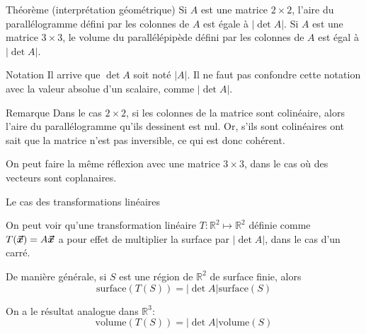 \documentclass[a4paper]{article}
\begin{document}
\begin{parag}{Théorème (interprétation géométrique)}
    Si $A$ est une matrice $2 \times 2$, l'aire du parallélogramme défini par les colonnes de $A$ est égale à $\left|\det A\right|$. Si $A$ est une matrice $3\times 3$, le volume du parallélépipède défini par les colonnes de $A$ est égal à $\left|\det A\right|$.


    \begin{subparag}{Notation}
        Il arrive que $\det A$ soit noté $\left|A\right|$. Il ne faut pas confondre cette notation avec la valeur absolue d'un scalaire, comme $\left|\det A\right|$.
    \end{subparag}


    \begin{subparag}{Remarque}
        Dans le cas $2\times 2$, si les colonnes de la matrice sont colinéaire, alors l'aire du parallélogramme qu'ils dessinent est nul. Or, s'ils sont colinéaires ont sait que la matrice n'est pas inversible, ce qui est donc cohérent.

        On peut faire la même réflexion avec une matrice $3\times 3$, dans le cas où des vecteurs sont coplanaires.
    \end{subparag}

\end{parag}
\begin{parag}{Le cas des transformations linéaires}

    On peut voir qu'une transformation linéaire $T : \mathbb{R}^2 \mapsto \mathbb{R}^2$ définie comme $T\left(\bvec{x}\right) = A \bvec{x}$ a pour effet de multiplier la surface par $\left|\det A\right|$, dans le cas d'un carré.

    De manière générale, si $S$ est une région de $\mathbb{R}^2$ de surface finie, alors
    \[\text{surface}\left(T\left(S\right)\right) = \left|\det A\right|\text{surface}\left(S\right)\]

    On a le résultat analogue dans $\mathbb{R}^3$:
    \[\text{volume}\left(T\left(S\right)\right) = \left|\det A\right| \text{volume}\left(S\right)\]


\end{parag}
\end{document}
